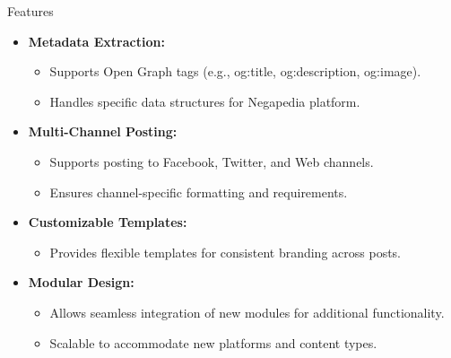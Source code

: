 \documentclass{beamer}
\begin{document}
    \begin{frame}{Features}
        \begin{itemize}
            \item \textbf{Metadata Extraction:}
                \begin{itemize}
                    \item Supports Open Graph tags (e.g., og:title, og:description, og:image).
                    \item Handles specific data structures for Negapedia platform.
                \end{itemize}
            \vspace{0.3cm}
            \item \textbf{Multi-Channel Posting:}
                \begin{itemize}
                    \item Supports posting to Facebook, Twitter, and Web channels.
                    \item Ensures channel-specific formatting and requirements.
                \end{itemize}
            \vspace{0.3cm}
            \item \textbf{Customizable Templates:}
                \begin{itemize}
                    \item Provides flexible templates for consistent branding across posts.
                \end{itemize}
            \vspace{0.3cm}
            \item \textbf{Modular Design:}
                \begin{itemize}
                    \item Allows seamless integration of new modules for additional functionality.
                    \item Scalable to accommodate new platforms and content types.
                \end{itemize}
        \end{itemize}
    \end{frame}
\end{document}
